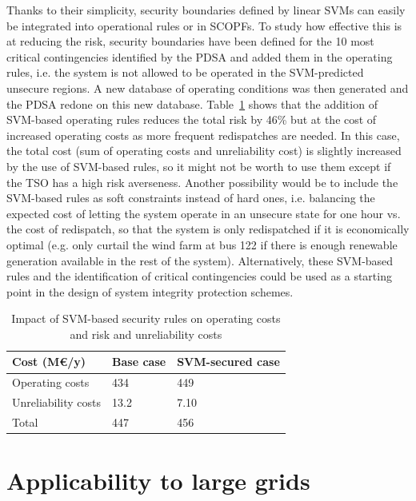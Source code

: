 Thanks to their simplicity, security boundaries defined by linear SVMs can easily be integrated into operational rules or in SCOPFs. To study how effective this is at reducing the risk, security boundaries have been defined for the 10 most critical contingencies identified by the PDSA and added them in the operating rules, i.e. the system is not allowed to be operated in the SVM-predicted unsecure regions. A new database of operating conditions was then generated and the PDSA redone on this new database. Table~\ref{tab:enhancement} shows that the addition of SVM-based operating rules reduces the total risk by 46\% but at the cost of increased operating costs as more frequent redispatches are needed. In this case, the total cost (sum of operating costs and unreliability cost) is slightly increased by the use of SVM-based rules, so it might not be worth to use them except if the TSO has a high risk averseness. Another possibility would be to include the SVM-based rules as soft constraints instead of hard ones, i.e. balancing the expected cost of letting the system operate in an unsecure state for one hour vs. the cost of redispatch, so that the system is only redispatched if it is economically optimal (e.g. only curtail the wind farm at bus 122 if there is enough renewable generation available in the rest of the system). Alternatively, these SVM-based rules and the identification of critical contingencies could be used as a starting point in the design of system integrity protection schemes.

\begin{table}
  \centering
  \caption{Impact of SVM-based security rules on operating costs and risk and unreliability costs}
  \label{tab:enhancement}
  \begin{tabular}{@{}lll@{}}
  \toprule
  Cost (M€/y) & Base case & SVM-secured case \\ \midrule
  Operating costs     & 434 & 449 \\
  Unreliability costs & 13.2  & 7.10 \\
  Total              & 447 & 456  \\ \bottomrule
  \end{tabular}
\end{table}


\section{Applicability to large grids}
\label{sec:PDSA_scalability}


